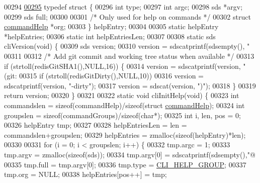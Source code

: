 \begin{DoxyCode}
{{{{00294 
\hyperlink{structhelpEntry}{00295} \textcolor{keyword}{typedef} \textcolor{keyword}{struct} \{
00296     \textcolor{keywordtype}{int} type;
00297     \textcolor{keywordtype}{int} argc;
00298     sds *argv;
00299     sds full;
00300 
00301     \textcolor{comment}{/* Only used for help on commands */}
00302     \textcolor{keyword}{struct} \hyperlink{structcommandHelp}{commandHelp} *org;
00303 \} helpEntry;
00304 
00305 \textcolor{keyword}{static} helpEntry *helpEntries;
00306 \textcolor{keyword}{static} \textcolor{keywordtype}{int} helpEntriesLen;
00307 
00308 \textcolor{keyword}{static} sds cliVersion(\textcolor{keywordtype}{void}) \{
00309     sds version;
00310     version = sdscatprintf(sdsempty(), \textcolor{stringliteral}{"%
00311 
00312     \textcolor{comment}{/* Add git commit and working tree status when available */}
00313     \textcolor{keywordflow}{if} (strtoll(redisGitSHA1(),NULL,16)) \{
00314         version = sdscatprintf(version, \textcolor{stringliteral}{" (git:%
00315         \textcolor{keywordflow}{if} (strtoll(redisGitDirty(),NULL,10))
00316             version = sdscatprintf(version, \textcolor{stringliteral}{"-dirty"});
00317         version = sdscat(version, \textcolor{stringliteral}{")"});
00318     \}
00319     \textcolor{keywordflow}{return} version;
00320 \}
00321 
00322 \textcolor{keyword}{static} \textcolor{keywordtype}{void} cliInitHelp(\textcolor{keywordtype}{void}) \{
00323     \textcolor{keywordtype}{int} commandslen = \textcolor{keyword}{sizeof}(commandHelp)/\textcolor{keyword}{sizeof}(\textcolor{keyword}{struct} \hyperlink{structcommandHelp}{commandHelp});
00324     \textcolor{keywordtype}{int} groupslen = \textcolor{keyword}{sizeof}(commandGroups)/\textcolor{keyword}{sizeof}(\textcolor{keywordtype}{char}*);
00325     \textcolor{keywordtype}{int} i, len, pos = 0;
00326     helpEntry tmp;
00327 
00328     helpEntriesLen = len = commandslen+groupslen;
00329     helpEntries = zmalloc(\textcolor{keyword}{sizeof}(helpEntry)*len);
00330 
00331     \textcolor{keywordflow}{for} (i = 0; i < groupslen; i++) \{
00332         tmp.argc = 1;
00333         tmp.argv = zmalloc(\textcolor{keyword}{sizeof}(sds));
00334         tmp.argv[0] = sdscatprintf(sdsempty(),\textcolor{stringliteral}{"@%
00335         tmp.full = tmp.argv[0];
00336         tmp.type = \hyperlink{redis-cli_8c_a3cac9e62f8d124c91f892f2236135589}{CLI\_HELP\_GROUP};
00337         tmp.org = NULL;
00338         helpEntries[pos++] = tmp;
}}}}}}}
\end{DoxyCode}
